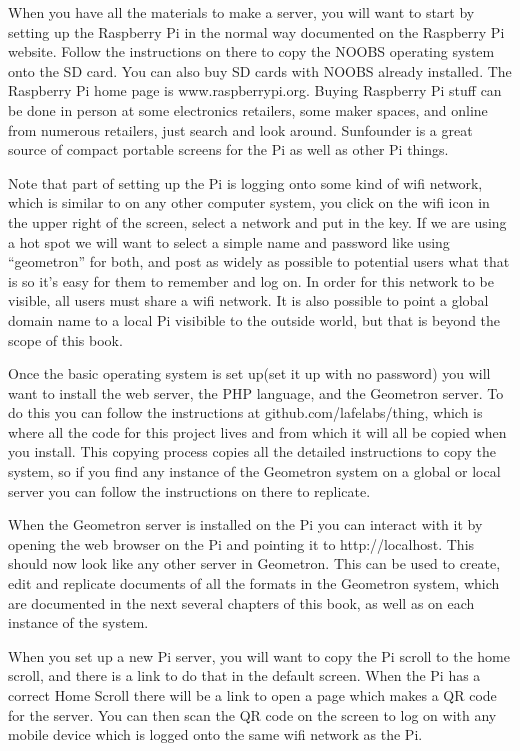 When you have all the materials to make a server, you will want to start by setting up the Raspberry Pi in the normal way documented on the Raspberry Pi website.  Follow the instructions on there to copy the NOOBS operating system onto the SD card.  You can also buy SD cards with NOOBS already installed.  The Raspberry Pi home page is www.raspberrypi.org.  Buying Raspberry Pi stuff can be done in person at some electronics retailers, some maker spaces, and online from numerous retailers, just search and look around.  Sunfounder is a great source of compact portable screens for the Pi as well as other Pi things.

Note that part of setting up the Pi is logging onto some kind of wifi network, which is similar to on any other computer system, you click on the wifi icon in the upper right of the screen, select a network and put in the key.  If we are using a hot spot we will want to select a simple name and password like using ``geometron'' for both, and post as widely as possible to potential users what that is so it's easy for them to remember and log on.  In order for this network to be visible, all users must share a wifi network.  It is also possible to point a global domain name to a local Pi visibible to the outside world, but that is beyond the scope of this book.

Once the basic operating system is set up(set it up with no password) you will want to install the web server, the PHP language, and the Geometron server.  To do this you can follow the instructions at github.com/lafelabs/thing, which is where all the code for this project lives and from which it will all be copied when you install.  This copying process copies all the detailed instructions to copy the system, so if you find any instance of the Geometron system on a global or local server you can follow the instructions on there to replicate.  

When the Geometron server is installed on the Pi you can interact with it by opening the web browser on the Pi and pointing it to http://localhost.  This should now look like any other server in Geometron.  This can be used to create, edit and replicate documents of all the formats in the Geometron system, which are documented in the next several chapters of this book, as well as on each instance of the system.

When you set up a new Pi server, you will want to copy the Pi scroll to the home scroll, and there is a link to do that in the default screen.  When the Pi has a correct Home Scroll there will be a link to open a page which makes a QR code for the server.  You can then scan the QR code on the screen to log on with any mobile device which is logged onto the same wifi network as the Pi.

